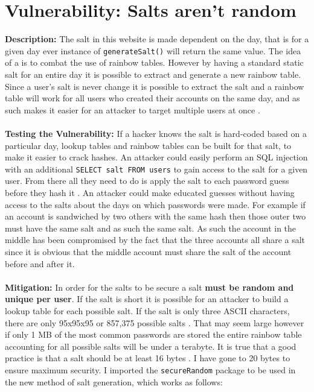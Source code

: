 \section{Vulnerability: Salts aren't random}
\label{sec:background}
\textbf{Description:} The salt in this website is made dependent on the day, that is for a given day ever instance of \verb|generateSalt()| will return the same value. The idea of a
is to combat the use of rainbow tables. However by having a standard static salt for an entire day it is possible to extract and generate a new rainbow table. Since a user's salt is
never change it is possible to extract the salt and a rainbow table will work for all users who created their accounts on the same day, and as such makes it easier for an attacker
to target multiple users at once \cite{salts1}. \\ \\
\textbf{Testing the Vulnerability:} If a hacker knows the salt is hard-coded based on a particular day, lookup tables and rainbow tables can be built for that salt, to make it
easier to crack hashes. An attacker could easily perform an SQL injection with an additional \verb|SELECT salt FROM users| to gain access to the salt for a given user. From there
all they need to do is apply the salt to each password guess before they hash it \cite{salts2}. An attacker could make educated guesses without having access to the salts about the days on which passwords were
made. For example if an account is sandwiched by two others with the same hash then those outer two must have the same salt and as such the same salt. As such the account in the
middle has been compromised by the fact that the three accounts all share a salt since it is obvious that the middle account must share the salt of the account before and after
it.\\ \\
\textbf{Mitigation:} In order for the salts to be secure a salt \textbf{must be random and unique per user}. If the salt is short it is possible for an attacker to build a
lookup table for each possible salt. If the salt is only three ASCII characters, there are only 95x95x95 or 857,375 possible salts \cite{salts1}. That may seem large however if
only 1 MB of the most common passwords are stored the entire rainbow table accounting for all possible salts will be under a terabyte. It is true that a good practice is that a
salt should be at least 16 bytes \cite{6516321}. I have gone to 20 bytes to
ensure maximum security. I imported the \verb|secureRandom| package to be used in the new method of salt generation, which works as follows:
